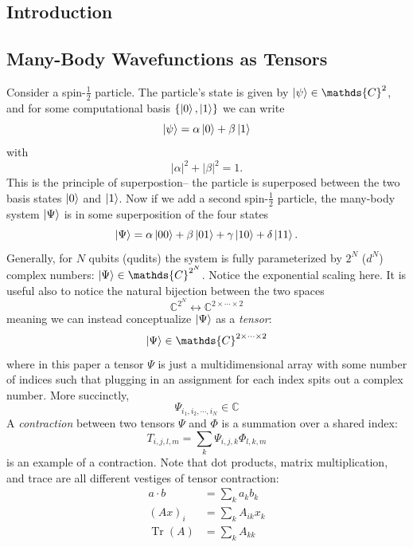 \documentclass[12pt]{article}
\DeclareMathOperator{\Tr}{Tr}
\begin{document}
\begin{multicols}{2}

\section*{Introduction}
	\subsection*{Many-Body Wavefunctions as Tensors}
		Consider a spin-$\frac{1}{2}$ particle. The particle's state is given by
		$\ket{\psi}\in\mathds{C}^2$, and for some computational basis
		$\{\ket{0}, \ket{1}\}$ we can write
		$$\ket{\psi}=\alpha\ket{0}+\beta\ket{1}$$
		with
		$$|\alpha|^2+|\beta|^2=1.$$
		This is the principle of superpostion-- the particle is superposed
		between the two basis states $\ket{0}$ and $\ket{1}$. Now if we add
		a second spin-$\frac{1}{2}$ particle, the many-body system
		$\ket{\Psi}$ is in some superposition of the four states
		$$\ket{\Psi}=\alpha\ket{00}+\beta\ket{01}+\gamma\ket{10}+\delta\ket{11}.$$
		Generally, for $N$ qubits (qudits) the system is fully
		parameterized by $2^N$ ($d^N$) complex numbers:
		$\ket{\Psi}\in\mathds{C}^{2^N}$. Notice the exponential scaling
		here. It is useful also to notice the natural bijection between
		the two spaces
		$$\mathds{C}^{2^N}\longleftrightarrow \mathds{C}^{2\times\cdots\times 2}$$
		meaning we can instead conceptualize $\ket{\Psi}$ as a
		\textit{tensor}:
		$$\ket{\Psi}\in\mathds{C}^{2\times\cdots\times2}$$
		where in this paper a tensor $\Psi$ is just a multidimensional
		array with some number of indices such that plugging in an
		assignment for each index spits out a complex number. More
		succinctly,
		$$\Psi_{i_1,i_2,\cdots,i_N}\in\mathds{C}$$
		A \textit{contraction} between two tensors $\Psi$ and $\Phi$ is
		a summation over a shared index:
		$$T_{i,j,l,m}=\sum_k\Psi_{i,j,k}\Phi_{l,k,m}$$
		is an example of a contraction. Note that dot products, matrix
		multiplication, and trace are all different vestiges of tensor
		contraction:
				\begin{align*}
				a\cdot b &=\sum_ka_kb_k\\
				(Ax)_{i} &=\sum_kA_{ik}x_k\\
				\Tr(A)&=\sum_kA_{kk}
			\end{align*}



\end{multicols}
\end{document}
